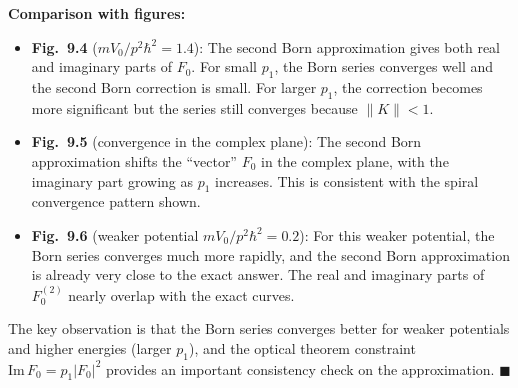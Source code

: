 \documentclass[12pt]{article}
\begin{document}
\textbf{Comparison with figures:}

\begin{itemize}
\item \textbf{Fig.~9.4} ($mV_0/p^2\hbar^2 = 1.4$): The second Born approximation gives both real and imaginary parts of $F_0$. For small $p_1$, the Born series converges well and the second Born correction is small. For larger $p_1$, the correction becomes more significant but the series still converges because $\|K\| < 1$.

\item \textbf{Fig.~9.5} (convergence in the complex plane): The second Born approximation shifts the ``vector'' $F_0$ in the complex plane, with the imaginary part growing as $p_1$ increases. This is consistent with the spiral convergence pattern shown.

\item \textbf{Fig.~9.6} (weaker potential $mV_0/p^2\hbar^2 = 0.2$): For this weaker potential, the Born series converges much more rapidly, and the second Born approximation is already very close to the exact answer. The real and imaginary parts of $F_0^{(2)}$ nearly overlap with the exact curves.
\end{itemize}

The key observation is that the Born series converges better for weaker potentials and higher energies (larger $p_1$), and the optical theorem constraint $\mathrm{Im}\,F_0 = p_1|F_0|^2$ provides an important consistency check on the approximation. \hfill $\blacksquare$
\end{document}
